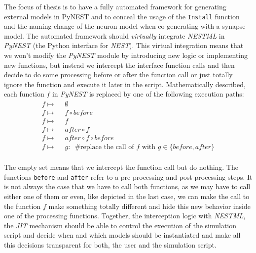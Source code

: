 The focus of thesis is to have a fully automated framework for generating external models in PyNEST and to conceal the usage of the \texttt{Install} function and the naming change of the neuron model when co-generating with a synapse model. The automated framework should \emph{virtually} integrate \emph{NESTML} in \emph{PyNEST} (the Python interface for \emph{NEST}). This virtual integration means that we won't modify the \emph{PyNEST} module by introducing new logic or implementing new functions, but instead we intercept the interface function calls and then decide to do some processing before or after the function call or just totally ignore the function and execute it later in the script. Mathematically described, each function $f$ in \emph{PyNEST} is replaced by one of the following execution paths:
\begin{align*}
    f \mapsto & \enspace\emptyset                                                                         \\
    f \mapsto & \enspace f \circ before                                                                   \\
    f \mapsto & \enspace f                                                                                \\
    f \mapsto & \enspace after \circ f                                                                    \\
    f \mapsto & \enspace after \circ f \circ before                                                       \\
    f \mapsto & \enspace g:\enspace \text{\#replace the call of } f \text{ with } g \in \{before, after\} \\
\end{align*}

The empty set means that we intercept the function call but do nothing. The functions \texttt{before} and \texttt{after} refer to a pre-processing and post-processing steps. It is not always the case that we have to call both functions, as we may have to call either one of them or even, like depicted in the last case, we can make the call to the function $f$ make something totally different and hide this new behavior inside one of  the processing functions. Together, the interception logic with \emph{NESTML}, the \emph{JIT} mechanism should be able to control the execution of the simulation script and decide when and which models should be instantiated and make all this decisions transparent for both, the user and the simulation script.

